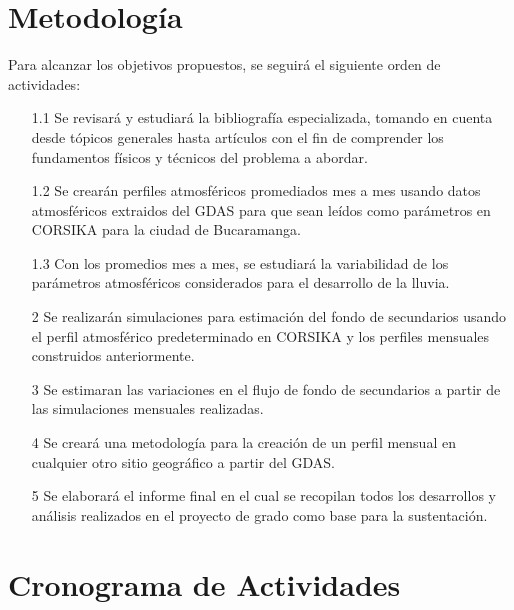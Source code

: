 \documentclass[11pt]{article}
\begin{document}
\section{Metodolog\'ia}

Para alcanzar los objetivos propuestos, se seguirá el siguiente orden de actividades:

\begin{itemize}

\item[1.1] Se revisará y estudiará la bibliografía especializada, tomando en cuenta desde
tópicos generales hasta artículos con el fin de comprender los fundamentos
físicos y técnicos del problema a abordar.
\item[1.2] Se crearán perfiles atmosféricos promediados mes a mes usando datos atmosféricos extraidos del GDAS para que sean leídos como parámetros en CORSIKA para la ciudad de Bucaramanga.

\item[1.3] Con los promedios mes a mes, se estudiará la variabilidad de los parámetros atmosféricos considerados para el desarrollo de la lluvia.
\item[2] Se realizarán simulaciones para estimación del fondo de secundarios usando el perfil atmosférico predeterminado en CORSIKA y los perfiles mensuales construidos anteriormente.
\item[3] Se estimaran las variaciones en el flujo de fondo de secundarios a partir de las simulaciones mensuales realizadas.
\item[4] Se creará una metodología para la creación de un perfil mensual en cualquier otro sitio geográfico a partir del GDAS.
\item[5] Se elaborará el informe final en el cual se recopilan todos los desarrollos y análisis realizados en el proyecto de grado como base para la sustentación.
 
\end{itemize}



\section{Cronograma de Actividades}	
\end{document}
